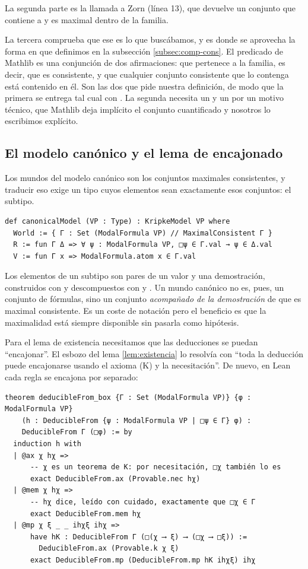 La segunda parte es la llamada a Zorn (línea 13), que devuelve un conjunto  que contiene a  y es maximal dentro de la familia.

La tercera comprueba que ese  es lo que buscábamos, y es donde se aprovecha la forma en que definimos  en la subsección \ref{subsec:comp-cons}. El predicado  de Mathlib es una conjunción de dos afirmaciones: que  pertenece a la familia, es decir, que es consistente, y que cualquier conjunto consistente que lo contenga está contenido en él. Son las dos que pide nuestra definición, de modo que la primera se entrega tal cual con . La segunda necesita un  y un  por un motivo técnico, que Mathlib deja implícito el conjunto cuantificado y nosotros lo escribimos explícito.

\subsection{El modelo canónico y el lema de encajonado}\label{subsec:comp-mod}

Los mundos del modelo canónico son los conjuntos maximales consistentes, y traducir eso exige un tipo cuyos elementos sean exactamente esos conjuntos: el subtipo.

\begin{lstlisting}
def canonicalModel (VP : Type) : KripkeModel VP where
  World := { Γ : Set (ModalFormula VP) // MaximalConsistent Γ }
  R := fun Γ Δ => ∀ ψ : ModalFormula VP, □ψ ∈ Γ.val → ψ ∈ Δ.val
  V := fun Γ x => ModalFormula.atom x ∈ Γ.val
\end{lstlisting}

Los elementos de un subtipo son pares de un valor y una demostración, construidos con  y descompuestos con  y . Un mundo canónico no es, pues, un conjunto de fórmulas, sino un conjunto \emph{acompañado de la demostración} de que es maximal consistente. Es un coste de notación pero el beneficio es que la maximalidad está siempre disponible sin pasarla como hipótesis.

Para el lema de existencia necesitamos que las deducciones se puedan ``encajonar''. El esbozo del lema \ref{lem:existencia} lo resolvía con ``toda la deducción puede encajonarse usando el axioma (K) y la necesitación''. De nuevo, en Lean cada regla se encajona por separado:

\begin{lstlisting}
theorem deducibleFrom_box {Γ : Set (ModalFormula VP)} {φ : ModalFormula VP}
    (h : DeducibleFrom {ψ : ModalFormula VP | □ψ ∈ Γ} φ) :
    DeducibleFrom Γ (□φ) := by
  induction h with
  | @ax χ hχ =>
      -- χ es un teorema de K: por necesitación, □χ también lo es
      exact DeducibleFrom.ax (Provable.nec hχ)
  | @mem χ hχ =>
      -- hχ dice, leído con cuidado, exactamente que □χ ∈ Γ
      exact DeducibleFrom.mem hχ
  | @mp χ ξ _ _ ihχξ ihχ =>
      have hK : DeducibleFrom Γ (□(χ ⟶ ξ) ⟶ (□χ ⟶ □ξ)) :=
        DeducibleFrom.ax (Provable.k χ ξ)
      exact DeducibleFrom.mp (DeducibleFrom.mp hK ihχξ) ihχ
\end{lstlisting}

